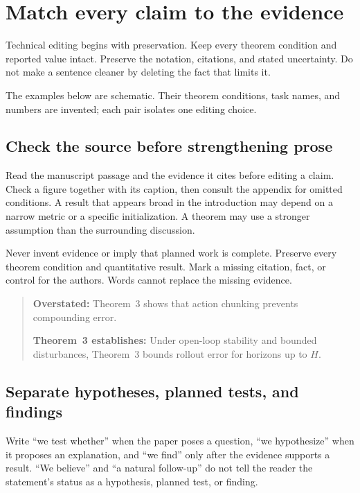 \section{Match every claim to the evidence}
\label{sec:integrity}

Technical editing begins with preservation. Keep every theorem condition and
reported value intact. Preserve the notation, citations, and stated
uncertainty. Do not make a sentence cleaner by deleting the fact that limits
it.

The examples below are schematic. Their theorem conditions, task names, and
numbers are invented; each pair isolates one editing choice.

\subsection{Check the source before strengthening prose}

Read the manuscript passage and the evidence it cites before editing a claim.
Check a figure together with its caption, then consult the appendix for omitted
conditions. A result that appears broad in the introduction may depend on a
narrow metric or a specific initialization. A theorem may use a stronger
assumption than the surrounding discussion.

Never invent evidence or imply that planned work is complete. Preserve every
theorem condition and quantitative result. Mark a missing citation, fact, or
control for the authors. Words cannot replace the missing evidence.

\begin{quote}
\textbf{Overstated:} Theorem~3 shows that action chunking prevents compounding
error.

\textbf{Theorem~3 establishes:} Under open-loop stability and bounded disturbances,
Theorem~3 bounds rollout error for horizons up to $H$.
\end{quote}

\subsection{Separate hypotheses, planned tests, and findings}

Write ``we test whether'' when the paper poses a question, ``we hypothesize''
when it proposes an explanation, and ``we find'' only after the evidence
supports a result. ``We believe'' and ``a natural follow-up'' do not tell the
reader the statement's status as a hypothesis, planned test, or finding.

